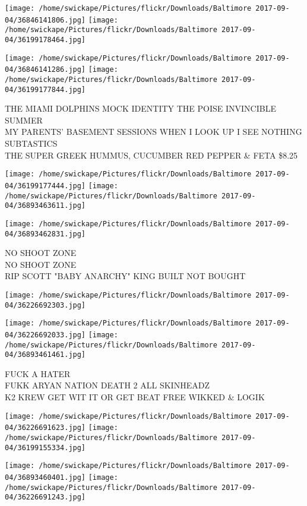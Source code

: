 \documentclass[10pt,letterpaper]{article}
\begin{document}
\texttt{[image: /home/swickape/Pictures/flickr/Downloads/Baltimore 2017-09-04/36846141806.jpg]}
\texttt{[image: /home/swickape/Pictures/flickr/Downloads/Baltimore 2017-09-04/36199178464.jpg]}

\texttt{[image: /home/swickape/Pictures/flickr/Downloads/Baltimore 2017-09-04/36846141286.jpg]}
\texttt{[image: /home/swickape/Pictures/flickr/Downloads/Baltimore 2017-09-04/36199177844.jpg]}

THE MIAMI DOLPHINS MOCK IDENTITY THE POISE INVINCIBLE SUMMER\\
MY PARENTS' BASEMENT SESSIONS WHEN I LOOK UP I SEE NOTHING\\
SUBTASTICS\\
THE SUPER GREEK HUMMUS, CUCUMBER RED PEPPER \& FETA \$8.25
\pagebreak

\texttt{[image: /home/swickape/Pictures/flickr/Downloads/Baltimore 2017-09-04/36199177444.jpg]}
\texttt{[image: /home/swickape/Pictures/flickr/Downloads/Baltimore 2017-09-04/36893463611.jpg]}

\texttt{[image: /home/swickape/Pictures/flickr/Downloads/Baltimore 2017-09-04/36893462831.jpg]}

NO SHOOT ZONE\\
NO SHOOT ZONE\\
RIP SCOTT "BABY ANARCHY" KING BUILT NOT BOUGHT
\pagebreak

\texttt{[image: /home/swickape/Pictures/flickr/Downloads/Baltimore 2017-09-04/36226692303.jpg]}

\vspace{0.25in}
\texttt{[image: /home/swickape/Pictures/flickr/Downloads/Baltimore 2017-09-04/36226692033.jpg]}
\texttt{[image: /home/swickape/Pictures/flickr/Downloads/Baltimore 2017-09-04/36893461461.jpg]}

FUCK A HATER\\
FUKK ARYAN NATION DEATH 2 ALL SKINHEADZ\\
K2 KREW GET WIT IT OR GET BEAT FREE WIKKED \& LOGIK
\pagebreak

\texttt{[image: /home/swickape/Pictures/flickr/Downloads/Baltimore 2017-09-04/36226691623.jpg]}
\texttt{[image: /home/swickape/Pictures/flickr/Downloads/Baltimore 2017-09-04/36199155334.jpg]}

\texttt{[image: /home/swickape/Pictures/flickr/Downloads/Baltimore 2017-09-04/36893460401.jpg]}
\texttt{[image: /home/swickape/Pictures/flickr/Downloads/Baltimore 2017-09-04/36226691243.jpg]}
\end{document}
